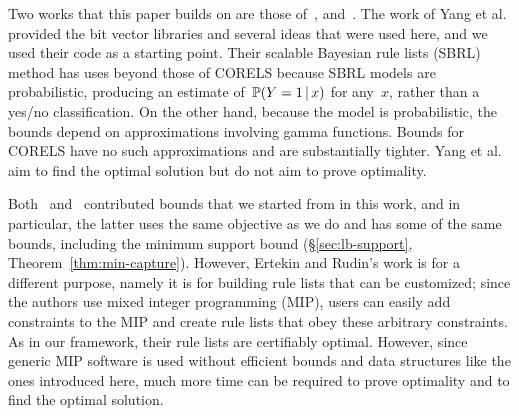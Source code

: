 \begin{arxiv}
Two works that this paper builds on are those of~\citet{YangRuSe16}, and~\citet{RudinEr15}.
%
The work of Yang et al. provided the bit vector libraries and several ideas that were used here,
and we used their code as a starting point.
%
Their scalable Bayesian rule lists (SBRL) method has uses beyond those of CORELS because SBRL models are probabilistic,
producing an estimate of~${\mathbb{P}(Y=1 \,|\, x)}$ for any~$x$, rather than a yes/no classification.
%
On the other hand, because the model is probabilistic, the bounds depend on approximations
involving gamma functions.
%
Bounds for CORELS have no such approximations and are substantially tighter.
%
Yang et al. aim to find the optimal solution but do not aim to prove optimality.

Both~\citet{YangRuSe16} and~\citet{RudinEr15} contributed bounds that we started from
in this work, and in particular, the latter uses the same objective as we do and has
some of the same bounds, including the minimum support bound (\S\ref{sec:lb-support}, Theorem~\ref{thm:min-capture}).
%
However, Ertekin and Rudin's work is for a different purpose,
namely it is for building rule lists that can be customized;
since the authors use mixed integer programming (MIP), users can easily
add constraints to the MIP and create rule lists that obey these arbitrary constraints.
%
As in our framework, their rule lists are certifiably optimal.
%
However, since generic MIP software is used without efficient bounds and
data structures like the ones introduced here,
much more time can be required to prove optimality and to find the optimal solution.
\end{arxiv}







